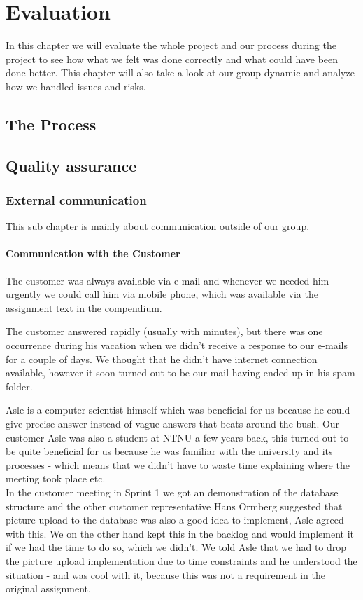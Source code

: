 \chapter{Evaluation}
In this chapter we will evaluate the whole project and our process during the project to see how what we felt was done correctly and what could have been done better. This chapter will also take a look at our group dynamic and analyze how we handled issues and risks.

\newpage
\section{The Process}


\section{Quality assurance}
\subsection{External communication}
This sub chapter is mainly about communication outside of our group.
\subsubsection{Communication with the Customer}
The customer was always available via e-mail and whenever we needed him urgently we could call him via mobile phone, which was available via the assignment text in the compendium.

The customer answered rapidly (usually with minutes), but there was one occurrence during his vacation when we didn't receive a response to our e-mails for a couple of days. We thought that he didn't have internet connection available, however it soon turned out to be our mail having ended up in his spam folder.

Asle is a computer scientist himself which was beneficial for us because he could give precise answer instead of vague answers that beats around the bush. Our customer Asle was also a student at NTNU a few years back, this turned out to be quite beneficial for us because he was familiar with the university and its processes - which means that we didn't have to waste time explaining where the meeting took place etc. \\
In the customer meeting in Sprint 1 we got an demonstration of the database structure and the other customer representative Hans Ormberg suggested that picture upload to the database was also a good idea to implement, Asle agreed with this. We on the other hand kept this in the backlog and would implement it if we had the time to do so, which we didn't. We told Asle that we had to drop the picture upload implementation due to time constraints and he understood the situation - and was cool with it, because this was not a requirement in the original assignment.

